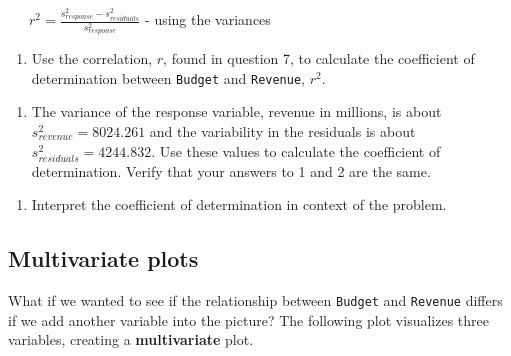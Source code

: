 \documentclass[
]{report}
\providecommand{\tightlist}{%
  \setlength{\itemsep}{0pt}\setlength{\parskip}{0pt}}
\begin{document}
~~~\(r^2 = \frac{s_{response}^2 - s_{residuals}^2}{s_{response}^2}\) - using the variances

\begin{enumerate}
\def\labelenumi{\arabic{enumi}.}
\tightlist
\item
  Use the correlation, \(r\), found in question 7, to calculate the coefficient of determination between \texttt{Budget} and \texttt{Revenue}, \(r^2\).
\end{enumerate}

\vspace{.4in}

\begin{enumerate}
\def\labelenumi{\arabic{enumi}.}
\setcounter{enumi}{1}
\tightlist
\item
  The variance of the response variable, revenue in millions, is about \(s_{revenue}^2 = 8024.261\) and the variability in the residuals is about \(s_{residuals}^2 = 4244.832\). Use these values to calculate the coefficient of determination. Verify that your answers to 1 and 2 are the same.
\end{enumerate}

\vspace{1in}

\begin{enumerate}
\def\labelenumi{\arabic{enumi}.}
\setcounter{enumi}{2}
\tightlist
\item
  Interpret the coefficient of determination in context of the problem.
\end{enumerate}

\vspace{.6in}

\hypertarget{multivariate-plots}{%
\subsection*{Multivariate plots}\label{multivariate-plots}}

What if we wanted to see if the relationship between \texttt{Budget} and \texttt{Revenue} differs if we add another variable into the picture? The following plot visualizes three variables, creating a \textbf{multivariate} plot.
\end{document}
